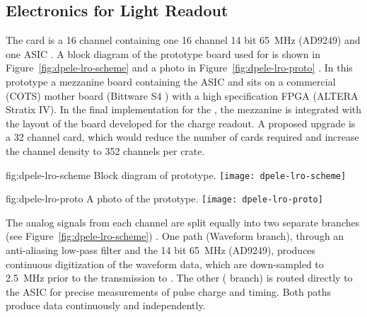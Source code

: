 \subsection{Electronics for Light Readout}
\label{sec:fddp-tpc-elec-design-lro}
%
The  card is a \num{16} channel  containing one \num{16} channel \num{14} bit \SI{65}{\MHz}  (AD9249) and one  ASIC \cite{Blin:2017}. A block diagram of the prototype board used for  is shown in Figure~\ref{fig:dpele-lro-scheme} and a photo in Figure~\ref{fig:dpele-lro-proto} . In this prototype a mezzanine board containing the ASIC and  sits on a commercial (COTS) mother board (Bittware S4 ) with a high specification FPGA (ALTERA Stratix IV). In the final implementation for the , the mezzanine is integrated with the layout of the  board developed for the charge readout.  
A proposed upgrade is a \num{32} channel card, %
which would reduce the number of cards required and increase the channel density to \num{352} channels per  crate.

\begin{dunefigure}{fig:dpele-lro-scheme}
{Block diagram of  prototype.}
\texttt{[image: dpele-lro-scheme]}
\end{dunefigure}

\begin{dunefigure}{fig:dpele-lro-proto}
{A photo of the  prototype.}
\texttt{[image: dpele-lro-proto]}
\end{dunefigure}

The analog signals from each  channel are split equally into two separate branches (see Figure~\ref{fig:dpele-lro-scheme}) . One path (Waveform branch), through an anti-aliasing low-pass filter and the \num{14} bit \SI{65}{\MHz}  (AD9249), produces continuous digitization of the  waveform data, which are down-sampled to \SI{2.5}{MHz} prior to the transmission to . The other ( branch) is routed directly to the  ASIC for precise measurements of pulse charge and timing. Both paths produce data continuously and independently.

